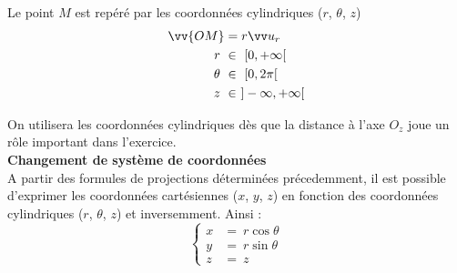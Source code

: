 \documentclass[10.5pt,a4paper]{book}
\begin{document}
\begin{boite}
\begin{minipage}{.5\textwidth}
\end{minipage}
\hfill
\begin{minipage}{.48\textwidth}
\begin{flushleft}
Le point $M$ est repéré par les coordonnées cylindriques ($r$, $\theta$, $z$)
\begin{align*}
  \vv{OM} &= r \vv u_r  \\ r \ &\in \ [0, +\infty[ \\ \theta \ &\in \ [0, 2\pi[ \\ z \ &\in \ ]-\infty, +\infty[
\end{align*}
\end{flushleft}
\end{minipage}

\vspace{2mm}

On utilisera les coordonnées cylindriques dès que la distance à l’axe $O_z$ joue un rôle important dans l’exercice.\\

\textbf{Changement de système de coordonnées}\\

A partir des formules de projections déterminées précedemment, il est possible d'exprimer les coordonnées cartésiennes ($x$, $y$, $z$) en fonction des coordonnées cylindriques ($r$, $\theta$, $z$) et inversemment. Ainsi :
\begin{equation*}
    \begin{cases}
      x &= \ r \cos{\theta}  \\
      y &= \ r \sin{\theta} \\
      z &= \ z
    \end{cases}       
\end{equation*}
\end{boite}
\end{document}
